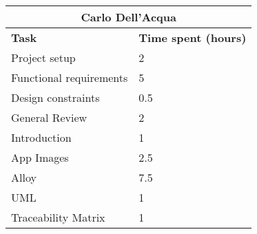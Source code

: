 \begin{table}[h]
  \centering
  \begin{tabular}{l|l}
    \multicolumn{2}{c}{\textbf{Carlo Dell'Acqua}} \\
    \hline
    \textbf{Task} & \textbf{Time spent (hours)}\\
    \hline
    Project setup & 2 \\
    Functional requirements & 5 \\
    Design constraints & 0.5 \\
    General Review & 2 \\
    Introduction & 1 \\
    App Images & 2.5 \\
    Alloy & 7.5 \\
    UML & 1 \\
    Traceability Matrix & 1 \\
  \end{tabular}
\end{table}